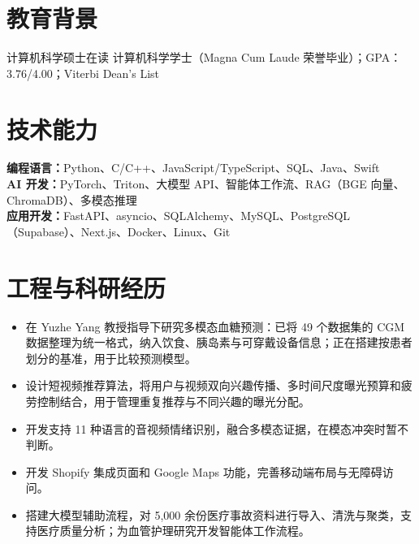 \documentclass[10pt]{article}
\begin{document}
\chineseheader

\section{教育背景}
计算机科学硕士在读
计算机科学学士（Magna Cum Laude 荣誉毕业）；GPA：3.76/4.00；Viterbi Dean's List

\section{技术能力}
\textbf{编程语言：}Python、C/C++、JavaScript/TypeScript、SQL、Java、Swift\\
\textbf{AI 开发：}PyTorch、Triton、大模型 API、智能体工作流、RAG（BGE 向量、ChromaDB）、多模态推理\\
\textbf{应用开发：}FastAPI、asyncio、SQLAlchemy、MySQL、PostgreSQL（Supabase）、Next.js、Docker、Linux、Git

\section{工程与科研经历}
\begin{itemize}
\item 在 Yuzhe Yang 教授指导下研究多模态血糖预测：已将 49 个数据集的 CGM 数据整理为统一格式，纳入饮食、胰岛素与可穿戴设备信息；正在搭建按患者划分的基准，用于比较预测模型。
\end{itemize}
\begin{itemize}
\item 设计短视频推荐算法，将用户与视频双向兴趣传播、多时间尺度曝光预算和疲劳控制结合，用于管理重复推荐与不同兴趣的曝光分配。
\item 开发支持 11 种语言的音视频情绪识别，融合多模态证据，在模态冲突时暂不判断。
\end{itemize}
\begin{itemize}
\item 开发 Shopify 集成页面和 Google Maps 功能，完善移动端布局与无障碍访问。
\end{itemize}
\begin{itemize}
\item 搭建大模型辅助流程，对 5,000 余份医疗事故资料进行导入、清洗与聚类，支持医疗质量分析；为血管护理研究开发智能体工作流程。
\end{itemize}
\end{document}

